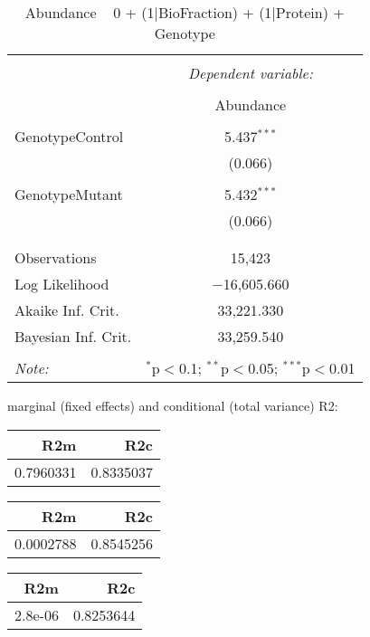 \documentclass[11pt]{report}
\begin{document}
\begin{table}[!htbp] \centering 
  \caption{Abundance ~ 0 + (1|BioFraction) + (1|Protein) + Genotype} 
  \label{} 
\begin{tabular}{@{\extracolsep{5pt}}lc} 
\\[-1.8ex]\hline 
\hline \\[-1.8ex] 
 & \multicolumn{1}{c}{\textit{Dependent variable:}} \\ 
\cline{2-2} 
\\[-1.8ex] & Abundance \\ 
\hline \\[-1.8ex] 
 GenotypeControl & 5.437$^{***}$ \\ 
  & (0.066) \\ 
  & \\ 
 GenotypeMutant & 5.432$^{***}$ \\ 
  & (0.066) \\ 
  & \\ 
\hline \\[-1.8ex] 
Observations & 15,423 \\ 
Log Likelihood & $-$16,605.660 \\ 
Akaike Inf. Crit. & 33,221.330 \\ 
Bayesian Inf. Crit. & 33,259.540 \\ 
\hline 
\hline \\[-1.8ex] 
\textit{Note:}  & \multicolumn{1}{r}{$^{*}$p$<$0.1; $^{**}$p$<$0.05; $^{***}$p$<$0.01} \\ 
\end{tabular} 
\end{table} 
marginal (fixed effects) and conditional (total variance) R2:

\begin{tabular}{r|r}
\hline
R2m & R2c\\
\hline
0.7960331 & 0.8335037\\
\hline
\end{tabular}

\begin{tabular}{r|r}
\hline
R2m & R2c\\
\hline
0.0002788 & 0.8545256\\
\hline
\end{tabular}

\begin{tabular}{r|r}
\hline
R2m & R2c\\
\hline
2.8e-06 & 0.8253644\\
\hline
\end{tabular}
\end{document}
